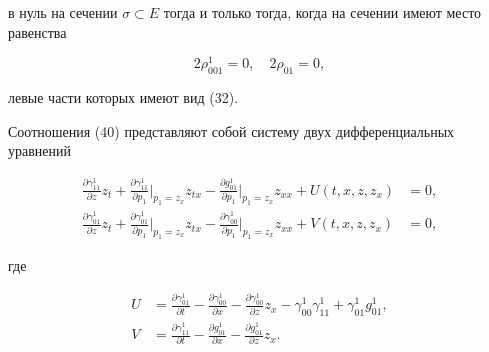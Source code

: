 в нуль на сечении $\sigma


\subset E$ тогда и только тогда, когда на сечении имеют место равенства


\begin{equation}


2\rho_{001}^1=0,\quad 2\rho_{01}=0,


\end{equation}


левые части которых имеют вид (32).


Соотношения (40) представляют собой систему двух дифференциальных уравнений


\begin{equation}


\begin{split}


\frac{{\partial \gamma_{11}^1}}{{\partial z}} z_t +


{\frac{{\partial \gamma_{11}^1}}{{\partial p_1}}} \Big|_{p_1=z_x}


z_{tx}-{\frac{{\partial g_{01}^1}}{{\partial p_1}}} \Big|_{p_1=z_x}


z_{xx}+U ({t,x,z,z_x})&=0, \\


\frac{{\partial \gamma_{01}^1}}{{\partial z}} z_t+


{\frac{{\partial \gamma_{01}^1}}{{\partial p_1}}} \Big|_{p_1=z_x}


z_{tx}-{\frac{{\partial \gamma_{00}^1}}{{\partial p_1}}}


\Big|_{p_1=z_x} z_{xx}+V ({t,x,z,z_x})&=0, 


\end{split}


\end{equation}


где


\begin{align*}


U&=\frac{{\partial \gamma_{01}^1}}{{\partial t}}-


\frac{{\partial \gamma_{00}^1}}{{\partial x}}-


\frac{{\partial \gamma_{00}^1}}{{\partial z}}


z_x-\gamma_{00}^1 \gamma_{11}^1+\gamma_{01}^1 g_{01}^1,\\


%


V&=\frac{{\partial \gamma_{11}^1}}{{\partial t}}-


\frac{{\partial g_{01}^1}}{{\partial x}}-


\frac{{\partial g_{01}^1}}{{\partial z}} z_x.


\end{align*}





